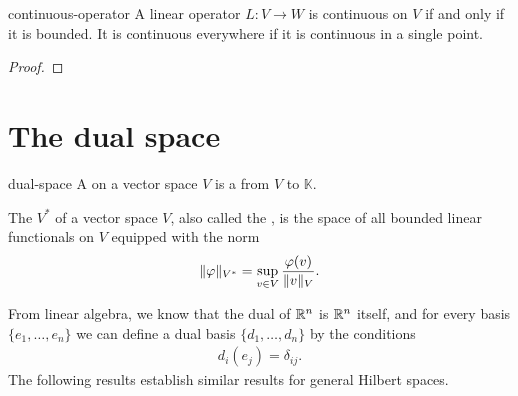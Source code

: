 \begin{Theorem}{continuous-operator}
  A linear operator $L\colon V\to W$ is continuous on $V$ if and only
  if it is bounded. It is continuous everywhere if it is continuous in
  a single point.
\end{Theorem}

\begin{todo}
  \begin{proof}
    
  \end{proof}
\end{todo}

\section{The dual space}

\begin{Definition}{dual-space}
  A  on a vector space $V$ is a
   from $V$ to $\mathbb K$.

  The  $V^*$ of a vector space $V$, also called the
  , is the space of all bounded linear functionals
  on $V$ equipped with the norm
  \begin{gather}
    \lVert\varphi\rVert_{V^*} = \sup_{v\in V} \frac{\varphi(v)}{\lVert v\rVert_V}.
  \end{gather}
\end{Definition}

\begin{intro}
  From linear algebra, we know that the dual of $\mathbb R^n$ is $\mathbb R^n$
  itself, and for every basis $\{e_1,\dots,e_n\}$ we can define a dual
  basis $\{d_1,\dots,d_n\}$ by the conditions
  \begin{gather*}
    d_i(e_j) = \delta_{ij}.
  \end{gather*}
  The following results establish similar results for general Hilbert
  spaces.
\end{intro}

